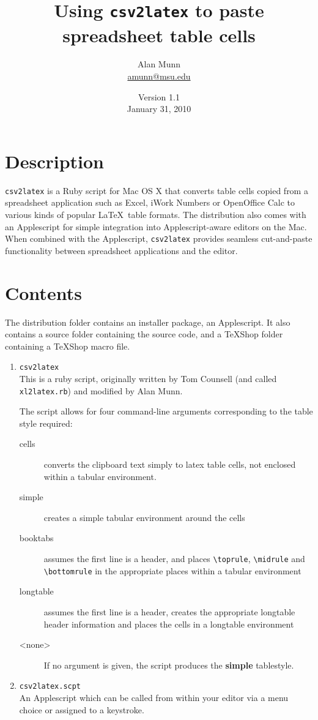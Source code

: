 \documentclass[11pt]{article}
\title{Using \texttt{csv2latex} to paste spreadsheet table cells}
\author{Alan Munn\\\protect\url{amunn@msu.edu}}
\date{Version 1.1\\January 31, 2010}
\newcommand{\BS}{\textbackslash}
\begin{document}
\maketitle
\section{Description}
\texttt{csv2latex} is a Ruby script for Mac OS X that converts table cells copied from a spreadsheet application such as Excel, iWork Numbers or OpenOffice Calc to various kinds of popular \LaTeX\ table formats. The distribution also comes with an Applescript for simple integration into Applescript-aware editors on the Mac. When combined with the Applescript, \texttt{csv2latex} provides seamless cut-and-paste functionality between spreadsheet applications and the editor.

\section{Contents}

The distribution folder contains an installer package, an Applescript. It also contains a source folder containing the source code, and a TeXShop folder containing a TeXShop macro file.
\begin{enumerate}
\item \texttt{csv2latex}\\
This is a ruby script, originally written by Tom Counsell (and called \texttt{xl2latex.rb}) and modified by Alan Munn.
	
The script allows for four command-line arguments corresponding to the table style required:
\begin{description}
\item[cells]		converts the clipboard text simply to latex table cells, not enclosed within a tabular environment.
\item[simple]	creates a simple tabular environment around the cells
\item[booktabs]	assumes the first line is a header, and places
					\texttt{\BS toprule}, \texttt{\BS midrule} and \texttt{\BS bottomrule} in the appropriate
					places within a tabular environment
\item[longtable]	assumes the first line is a header, creates
					the appropriate longtable header information and places
					the cells in a longtable environment
					
\item[<none>] If no argument is given, the script produces the \textbf{simple} tablestyle.
\end{description}
\item	\texttt{csv2latex.scpt}\\An Applescript which can be called from within your editor via a menu choice or assigned to a keystroke.
\end{enumerate}
\end{document}
